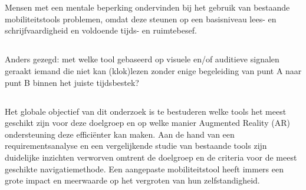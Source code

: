 
\chapter{}%
\label{ch:inleiding}

\section{}%
\label{sec:probleemstelling}

Mensen met een mentale beperking ondervinden bij het gebruik van bestaande mobiliteitstools
problemen, omdat deze steunen op een basisniveau lees- en schrijfvaardigheid en voldoende tijds- en ruimtebesef.


\section{}%
\label{sec:onderzoeksvraag}

Anders gezegd: met welke tool gebaseerd op visuele en/of auditieve signalen geraakt iemand die niet kan (klok)lezen zonder enige begeleiding van punt A naar punt B binnen het juiste tijdsbestek? 

\section{}%
\label{sec:onderzoeksdoelstelling}

Het globale objectief van dit onderzoek is te bestuderen welke tools het meest geschikt zijn voor deze doelgroep en op welke manier Augmented Reality (AR) ondersteuning deze efficiënter kan maken. Aan de hand van een requirementsanalyse en een vergelijkende studie van bestaande tools zijn duidelijke inzichten verworven omtrent de doelgroep en de criteria voor de meest geschikte navigatiemethode. Een aangepaste mobiliteitstool heeft immers een grote impact en meerwaarde op het vergroten van hun zelfstandigheid. 

\section{}%
\label{sec:opzet-bachelorproef}

